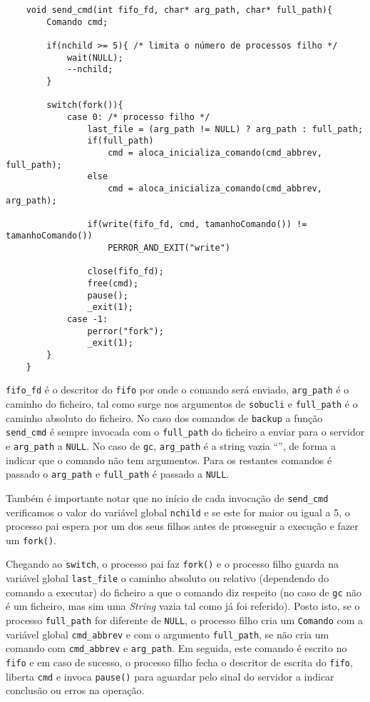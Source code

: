 \documentclass[a4paper,12pt,titlepage,portuguese]{article}
\begin{document}
	\begin{verbatim}
	void send_cmd(int fifo_fd, char* arg_path, char* full_path){
		Comando cmd;

		if(nchild >= 5){ /* limita o número de processos filho */
			wait(NULL);
			--nchild;
		}

		switch(fork()){
			case 0: /* processo filho */
				last_file = (arg_path != NULL) ? arg_path : full_path;
				if(full_path)
					cmd = aloca_inicializa_comando(cmd_abbrev, full_path);
				else
					cmd = aloca_inicializa_comando(cmd_abbrev, arg_path);
				
				if(write(fifo_fd, cmd, tamanhoComando()) != tamanhoComando())
					PERROR_AND_EXIT("write")
				
				close(fifo_fd);
				free(cmd);
				pause();
				_exit(1);
			case -1:
				perror("fork");
				_exit(1);
		}
	}
	\end{verbatim}

\texttt{fifo\_fd} é o descritor do \texttt{fifo} por onde o comando será enviado, \texttt{arg\_path} é o caminho do ficheiro, tal como surge nos argumentos de \texttt{sobucli} e \texttt{full\_path} é o caminho absoluto do ficheiro. No caso dos comandos de \texttt{backup} a função \texttt{send\_cmd} é sempre invocada com o \texttt{full\_path} do ficheiro a enviar para o servidor e \texttt{arg\_path} a \texttt{NULL}. No caso de \texttt{gc},  \texttt{arg\_path} é a string vazia ``'', de forma a indicar que o comando não tem argumentos. Para os restantes comandos é passado o \texttt{arg\_path} e \texttt{full\_path} é passado a \texttt{NULL}.

Também é importante notar que no início de cada invocação de \texttt{send\_cmd} verificamos o valor do variável global \texttt{nchild} e se este for maior ou igual a 5, o processo pai espera por um dos seus filhos antes de prosseguir a execução e fazer um \texttt{fork()}.

Chegando ao \texttt{switch}, o processo pai faz \texttt{fork()} e o processo filho guarda na variável global \texttt{last\_file} o caminho absoluto ou relativo (dependendo do comando a executar) do ficheiro a que o comando diz respeito (no caso de \texttt{gc} não é um ficheiro, mas sim uma \emph{String} vazia tal como já foi referido). Posto isto, se o processo \texttt{full\_path} for diferente de \texttt{NULL}, o processo filho cria um \texttt{Comando} com a variável global \texttt{cmd\_abbrev} e com o argumento \texttt{full\_path}, se não cria um comando com \texttt{cmd\_abbrev} e \texttt{arg\_path}. Em seguida, este comando é escrito no \texttt{fifo} e em caso de sucesso, o processo filho fecha o descritor de escrita do \texttt{fifo}, liberta \texttt{cmd} e invoca \texttt{pause()} para aguardar pelo sinal do servidor a indicar conclusão ou erros na operação.
\end{document}
